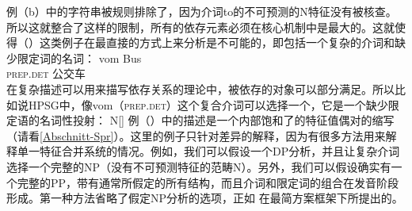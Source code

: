 例（b）中的字符串被规则排除了，因为介词to的不可预测的N特征没有被核查。所以这就整合了这样的限制，所有的依存元素必须在核心机制中是最大的。这就使得（）这类例子在最直接的方式上来分析是不可能的，即包括一个复杂的介词和缺少限定词的名词：
\ea
\gll vom Bus\\
     \textsc{prep}.\textsc{det} 公交车\\
\z
在复杂描述可以用来描写依存关系的理论中，被依存的对象可以部分满足。所以比如说HPSG中，像vom（\textsc{prep}.\textsc{det}）这个复合介词可以选择一个\nbarc ，它是一个缺少限定语的名词性投射：
\ea
N[\spr {}]
\z
例（）中的描述是一个内部饱和了的特征值偶对的缩写（请看\ref{Abschnitt-Spr}）。这里的例子只针对差异的解释，因为有很多方法用来解释单一特征合并系统的情况。例如，我们可以假设一个DP分析，并且让复杂介词选择一个完整的NP（没有不可预测特征的范畴N）。另外，我们可以假设确实有一个完整的PP，带有通常所假定的所有结构，而且介词和限定词的组合在发音阶段形成。第一种方法省略了假定NP分析的选项，正如 \citet{Bruening2009a}在最简方案框架下所提出的。

